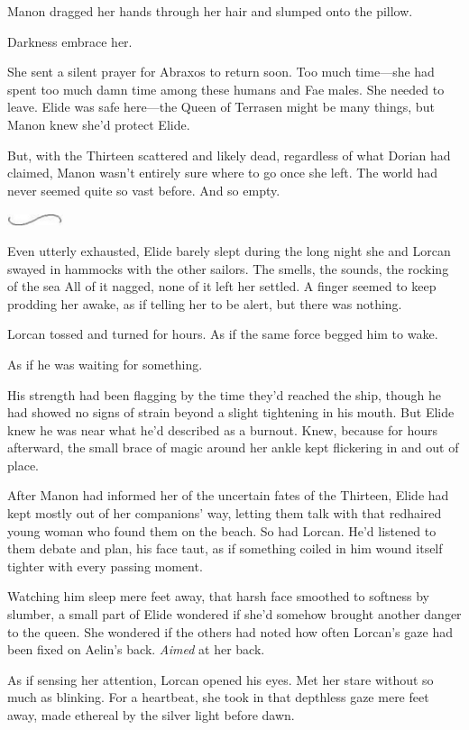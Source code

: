Manon dragged her hands through her hair and slumped onto the pillow.

Darkness embrace her.

She sent a silent prayer for Abraxos to return soon. Too much time---she had spent too much damn time among these humans and Fae males. She needed to leave. Elide was safe here---the Queen of Terrasen might be many things, but Manon knew she'd protect Elide.

But, with the Thirteen scattered and likely dead, regardless of what Dorian had claimed, Manon wasn't entirely sure where to go once she left. The world had never seemed quite so vast before. And so empty.

\includegraphics[width=0.65in,height=0.13in]{images/seperator}

Even utterly exhausted, Elide barely slept during the long night she and Lorcan swayed in hammocks with the other sailors. The smells, the sounds, the rocking of the sea  All of it nagged, none of it left her settled. A finger seemed to keep prodding her awake, as if telling her to be alert, but  there was nothing.

Lorcan tossed and turned for hours. As if the same force begged him to wake.

As if he was waiting for something.

His strength had been flagging by the time they'd reached the ship, though he had showed no signs of strain beyond a slight tightening in his mouth. But Elide knew he was near what he'd described as a burnout. Knew, because for hours afterward, the small brace of magic around her ankle kept flickering in and out of place.

After Manon had informed her of the uncertain fates of the Thirteen, Elide had kept mostly out of her companions' way, letting them talk with that redhaired young woman who found them on the beach. So had Lorcan. He'd listened to them debate and plan, his face taut, as if something coiled in him wound itself tighter with every passing moment.

Watching him sleep mere feet away, that harsh face smoothed to softness by slumber, a small part of Elide wondered if she'd somehow brought another danger to the queen. She wondered if the others had noted how often Lorcan's gaze had been fixed on Aelin's back. \emph{Aimed} at her back.

As if sensing her attention, Lorcan opened his eyes. Met her stare without so much as blinking. For a heartbeat, she took in that depthless gaze mere feet away, made ethereal by the silver light before dawn.

